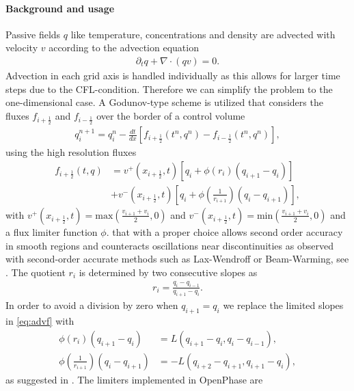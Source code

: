 \paragraph{Background and usage} Passive fields $q$ like temperature, concentrations and density are advected with velocity $v$ according to the advection equation
\begin{align}
\partial_t q + \nabla \cdot (qv) = 0.
\end{align}
Advection in each grid axis is handled individually as this allows for larger time steps due to the CFL-condition. Therefore we can simplify the problem to the one-dimensional case.
A Godunov-type scheme is utilized that considers the fluxes $f_{i+\frac{1}{2}}$ and $f_{i-\frac{1}{2}}$ over the border of a control volume
\begin{align}
q_i^{n+1} = q_i^n - \frac{dt}{dx}\left[f_{i+\frac{1}{2}}(t^n,q^n)-f_{i-\frac{1}{2}}(t^n,q^n)\right],
\end{align}
using the high resolution fluxes
\begin{align}
f_{i+\frac{1}{2}}(t,q) &= v^+(x_{i+\frac{1}{2}},t)\left[q_i+\phi\left(r_i\right)\left(q_{i+1}-q_i\right)\right]\\ \label{eq:advf}
                       &+ v^-(x_{i+\frac{1}{2}},t)\left[q_i+\phi\left(\frac{1}{r_{i+1}}\right)\left(q_{i}-q_{i+1}\right)\right],
\end{align}
with $v^+(x_{i+\frac{1}{2}},t) = \text{max}(\frac{v_{i+1}+v_i}{2},0)$ and $v^-(x_{i+\frac{1}{2}},t) = \text{min}(\frac{v_{i+1}+v_i}{2},0)$ and a flux limiter function $\phi$. that with a proper choice allows second order accuracy in smooth regions and counteracts oscillations near discontinuities as observed with second-order accurate methods such as Lax-Wendroff or Beam-Warming, see . The quotient $r_i$ is determined by two consecutive slopes as
\begin{align}
r_i = \frac{q_i-q_{i-1}}{q_{i+1}-q_i}.
\end{align}
In order to avoid a division by zero when $q_{i+1} = q_i$ we replace the limited slopes in \ref{eq:advf} with
\begin{align}
\phi(r_i)(q_{i+1}-q_i) &= L(q_{i+1}-q_i,q_i-q_{i-1}),\\
\phi\left(\frac{1}{r_{i+1}}\right)\left(q_{i}-q_{i+1}\right) &= -L(q_{i+2}-q_{i+1},q_{i+1}-q_{i}),
\end{align}
as suggested in . 
The limiters implemented in OpenPhase are\\
\\
